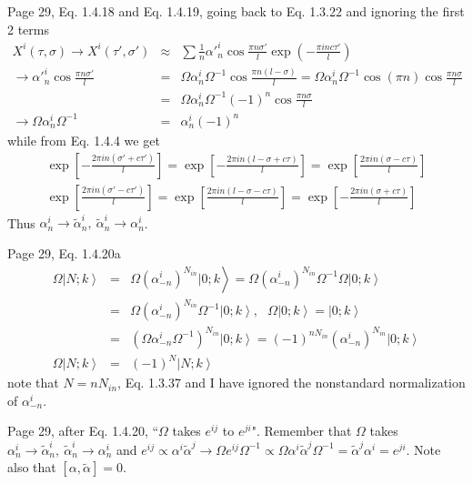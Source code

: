 \documentclass[aps,preprint,preprintnumbers,nofootinbib,showpacs,prd]{revtex4-1}
\newcommand{\nbea}{\begin{eqnarray*}}
\newcommand{\neea}{\end{eqnarray*}}
\begin{document}
Page 29, Eq. 1.4.18 and Eq. 1.4.19, going back to Eq. 1.3.22 and ignoring the first 2 terms
%
\nbea
X^i(\tau,\sigma) \rightarrow X^i(\tau',\sigma') & \approx & \sum \frac{1}{n}\alpha'^i_n \cos \frac{\pi n \sigma'}{l} \exp\left ( -\frac{\pi i n c \tau'}{l}\right ) \\
\rightarrow \alpha'^i_n \cos \frac{\pi n \sigma'}{l} & = & \Omega \alpha^i_n \Omega^{-1} \cos \frac{\pi n (l - \sigma)}{l} = \Omega \alpha^i_n \Omega^{-1} \cos (\pi n) \cos \frac{\pi n \sigma}{l} \\
& = & \Omega \alpha^i_n \Omega^{-1} (-1)^n \cos \frac{\pi n \sigma}{l} \\
\rightarrow \Omega \alpha^i_n \Omega^{-1} & = & \alpha^i_n (-1)^n
\neea
%
while from Eq. 1.4.4 we get
%
\nbea
\exp \left \lbrack -\frac{2\pi i n(\sigma' + c\tau')}{l} \right \rbrack = \exp \left \lbrack -\frac{2\pi i n(l - \sigma + c\tau)}{l} \right \rbrack = \exp \left \lbrack \frac{2\pi i n(\sigma - c\tau)}{l} \right \rbrack \\
\exp \left \lbrack \frac{2\pi i n(\sigma' - c\tau')}{l} \right \rbrack = \exp \left \lbrack \frac{2\pi i n(l - \sigma - c\tau)}{l} \right \rbrack = \exp \left \lbrack -\frac{2\pi i n(\sigma + c\tau)}{l} \right \rbrack
\neea
%
Thus $\alpha^i_n \rightarrow \tilde \alpha^i_n,~ \tilde \alpha^i_n \rightarrow \alpha^i_n$.

Page 29, Eq. 1.4.20a
%
\nbea
\Omega \left . | N; k \right \rangle & = & \Omega \left . (\alpha^i_{-n})^{N_{in}} | 0 ; k \right \rangle = \Omega (\alpha^i_{-n})^{N_{in}} \Omega^{-1} \Omega \left . | 0 ; k \right \rangle \\
& = & \Omega (\alpha^i_{-n})^{N_{in}} \Omega^{-1} \left . | 0 ; k \right \rangle , ~~~ \Omega \left .| 0 ; k \right \rangle  = \left . | 0 ; k \right \rangle \\
& = & (\Omega \alpha^i_{-n} \Omega^{-1})^{N_{in}} \left . | 0 ; k \right \rangle = (-1)^{nN_{in}}(\alpha^i_{-n})^{N_{in}} \left . | 0 ; k \right \rangle \\
\Omega \left . | N; k \right \rangle & = & (-1)^{N} \left . | N ; k \right \rangle 
\neea
%
note that $N = nN_{in}$, Eq. 1.3.37 and I have ignored the nonstandard normalization of $\alpha^i_{-n}$.

Page 29, after Eq. 1.4.20, ``$\Omega$ takes $e^{ij}$ to $e^{ji}$". Remember that $\Omega$ takes $\alpha^i_n \rightarrow \tilde \alpha^i_n,~ \tilde \alpha^i_n \rightarrow \alpha^i_n$ and $e^{ij} \propto \alpha^i \tilde \alpha^j \rightarrow \Omega e^{ij} \Omega^{-1} \propto \Omega \alpha^i \tilde \alpha^j \Omega^{-1} = \tilde \alpha^j \alpha^i = e^{ji}$. Note also that $[\alpha, \tilde \alpha] = 0$.
\end{document}
